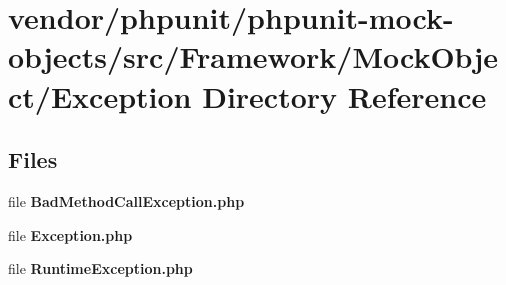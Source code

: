 \section{vendor/phpunit/phpunit-\/mock-\/objects/src/\+Framework/\+Mock\+Object/\+Exception Directory Reference}
\label{dir_a5d7c34b0b9f4b6bf91642c8261b937c}
\subsection*{Files}
\begin{DoxyCompactItemize}
\item 
file {\bf Bad\+Method\+Call\+Exception.\+php}
\item 
file {\bf Exception.\+php}
\item 
file {\bf Runtime\+Exception.\+php}
\end{DoxyCompactItemize}
